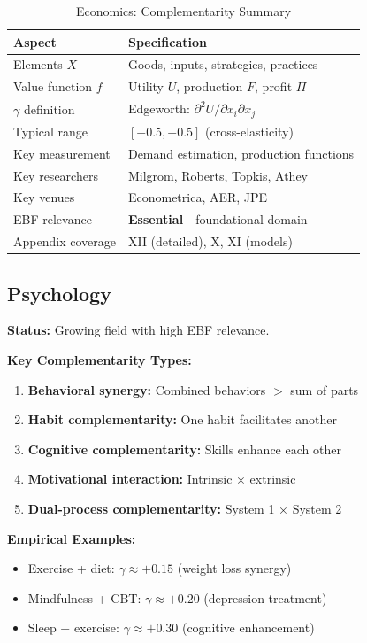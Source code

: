 \begin{table}[h]
\centering
\caption{Economics: Complementarity Summary}
\label{tab:econ-summary}
\renewcommand{\arraystretch}{1.3}
\small
\begin{tabular}{@{}ll@{}}
\toprule
\textbf{Aspect} & \textbf{Specification} \\
\midrule
Elements $X$ & Goods, inputs, strategies, practices \\
Value function $f$ & Utility $U$, production $F$, profit $\Pi$ \\
$\gamma$ definition & Edgeworth: $\partial^2 U / \partial x_i \partial x_j$ \\
Typical range & $[-0.5, +0.5]$ (cross-elasticity) \\
Key measurement & Demand estimation, production functions \\
Key researchers & Milgrom, Roberts, Topkis, Athey \\
Key venues & Econometrica, AER, JPE \\
EBF relevance & \textbf{Essential} - foundational domain \\
Appendix coverage & XII (detailed), X, XI (models) \\
\bottomrule
\end{tabular}
\end{table}

\subsection{Psychology}
\label{sec:psych}

\begin{tcolorbox}[colback=purple!5!white,colframe=purple!75!black,title=\textbf{Psychology: Behavioral Interactions}]

\textbf{Status:} Growing field with high EBF relevance.

\textbf{Key Complementarity Types:}
\begin{enumerate}[noitemsep]
    \item \textbf{Behavioral synergy:} Combined behaviors $>$ sum of parts
    \item \textbf{Habit complementarity:} One habit facilitates another
    \item \textbf{Cognitive complementarity:} Skills enhance each other
    \item \textbf{Motivational interaction:} Intrinsic × extrinsic
    \item \textbf{Dual-process complementarity:} System 1 × System 2
\end{enumerate}

\textbf{Empirical Examples:}
\begin{itemize}[noitemsep]
    \item Exercise + diet: $\gamma \approx +0.15$ (weight loss synergy)
    \item Mindfulness + CBT: $\gamma \approx +0.20$ (depression treatment)
    \item Sleep + exercise: $\gamma \approx +0.30$ (cognitive enhancement)
\end{itemize}

\end{tcolorbox}

